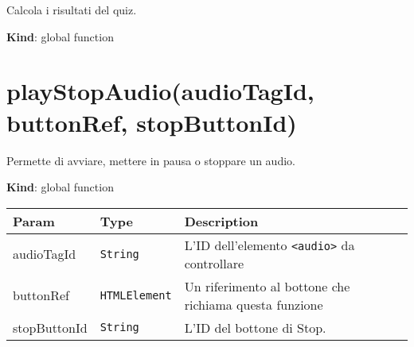 Calcola i risultati del quiz.

\textbf{Kind}: global function\\
\protect\hypertarget{playStopAudio}{}{}

\hypertarget{playstopaudioaudiotagid-buttonref-stopbuttonid}{%
\section{playStopAudio(audioTagId, buttonRef,
stopButtonId)}\label{playstopaudioaudiotagid-buttonref-stopbuttonid}}

Permette di avviare, mettere in pausa o stoppare un audio.

\textbf{Kind}: global function

\begin{longtabu} to \textwidth {X[1,L,m]X[1,L,m]X[1.5,L,m]}
\toprule
\begin{minipage}[b]{0.30\columnwidth}\raggedright
Param\strut
\end{minipage} & \begin{minipage}[b]{0.30\columnwidth}\raggedright
Type\strut
\end{minipage} & \begin{minipage}[b]{0.30\columnwidth}\raggedright
Description\strut
\end{minipage}\tabularnewline
\midrule
\endhead
\begin{minipage}[t]{0.30\columnwidth}\raggedright
audioTagId\strut
\end{minipage} & \begin{minipage}[t]{0.30\columnwidth}\raggedright
\texttt{String}\strut
\end{minipage} & \begin{minipage}[t]{0.30\columnwidth}\raggedright
L'ID dell'elemento \texttt{\textless{}audio\textgreater{}} da
controllare\strut
\end{minipage}\tabularnewline
\begin{minipage}[t]{0.30\columnwidth}\raggedright
buttonRef\strut
\end{minipage} & \begin{minipage}[t]{0.30\columnwidth}\raggedright
\texttt{HTMLElement}\strut
\end{minipage} & \begin{minipage}[t]{0.30\columnwidth}\raggedright
Un riferimento al bottone che richiama questa funzione\strut
\end{minipage}\tabularnewline
\begin{minipage}[t]{0.30\columnwidth}\raggedright
stopButtonId\strut
\end{minipage} & \begin{minipage}[t]{0.30\columnwidth}\raggedright
\texttt{String}\strut
\end{minipage} & \begin{minipage}[t]{0.30\columnwidth}\raggedright
L'ID del bottone di Stop.\strut
\end{minipage}\tabularnewline
\bottomrule
\end{longtabu}

